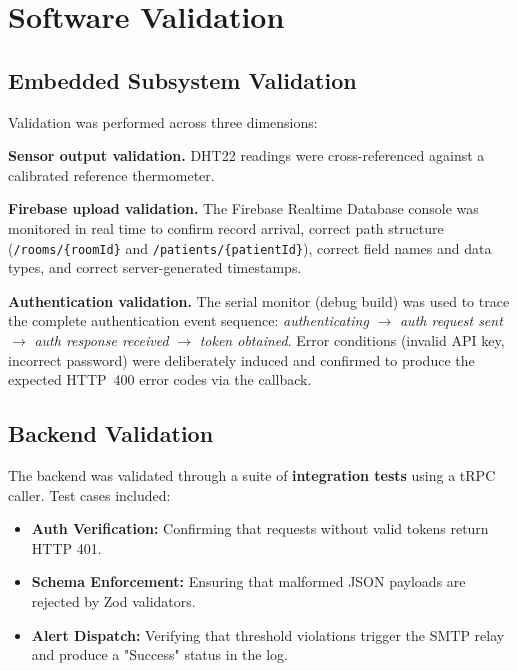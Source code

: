 \section{Software Validation}

\subsection{Embedded Subsystem Validation}

Validation was performed across three dimensions:

\textbf{Sensor output validation.}
DHT22 readings were cross-referenced against a calibrated reference thermometer.

\textbf{Firebase upload validation.}
The Firebase Realtime Database console was monitored in real time to confirm record
arrival, correct path structure (\texttt{/rooms/\{roomId\}} and
\texttt{/patients/\{patientId\}}), correct field names and data types, and
correct server-generated timestamps.

\textbf{Authentication validation.}
The serial monitor (debug build) was used to trace the complete authentication event
sequence: \textit{authenticating} $\to$ \textit{auth request sent} $\to$
\textit{auth response received} $\to$ \textit{token obtained}.
Error conditions (invalid API key, incorrect password) were deliberately induced
and confirmed to produce the expected HTTP~400 error codes via the callback.

\subsection{Backend Validation}
The backend was validated through a suite of \textbf{integration tests} using a tRPC caller. Test cases included:
\begin{itemize}
    \item \textbf{Auth Verification:} Confirming that requests without valid tokens return HTTP 401.
    \item \textbf{Schema Enforcement:} Ensuring that malformed JSON payloads are rejected by Zod validators.
    \item \textbf{Alert Dispatch:} Verifying that threshold violations trigger the SMTP relay and produce a "Success" status in the log.
\end{itemize}

